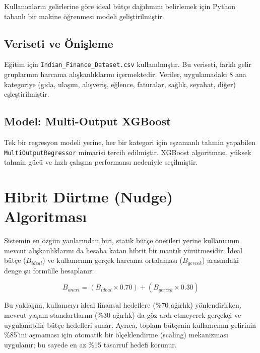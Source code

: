 Kullanıcıların gelirlerine göre ideal bütçe dağılımını belirlemek için Python tabanlı bir makine öğrenmesi modeli geliştirilmiştir.

\subsection{Veriseti ve Önişleme}
Eğitim için \texttt{Indian\_Finance\_Dataset.csv} kullanılmıştır. Bu veriseti, farklı gelir gruplarının harcama alışkanlıklarını içermektedir. Veriler, uygulamadaki 8 ana kategoriye (gıda, ulaşım, alışveriş, eğlence, faturalar, sağlık, seyahat, diğer) eşleştirilmiştir.

\subsection{Model: Multi-Output XGBoost}
Tek bir regresyon modeli yerine, her bir kategori için eşzamanlı tahmin yapabilen \texttt{MultiOutputRegressor} mimarisi tercih edilmiştir. XGBoost algoritması, yüksek tahmin gücü ve hızlı çalışma performansı nedeniyle seçilmiştir.

\section{Hibrit Dürtme (Nudge) Algoritması}

Sistemin en özgün yanlarından biri, statik bütçe önerileri yerine kullanıcının mevcut alışkanlıklarını da hesaba katan hibrit bir mantık yürütmesidir. İdeal bütçe ($B_{ideal}$) ve kullanıcının gerçek harcama ortalaması ($B_{gercek}$) arasındaki denge şu formülle hesaplanır:

\begin{equation}
\label{eq:hybrid}
   B_{oneri} = (B_{ideal} \times 0.70) + (B_{gercek} \times 0.30)
\end{equation}

Bu yaklaşım, kullanıcıyı ideal finansal hedeflere (\%70 ağırlık) yönlendirirken, mevcut yaşam standartlarını (\%30 ağırlık) da göz ardı etmeyerek gerçekçi ve uygulanabilir bütçe hedefleri sunar. Ayrıca, toplam bütçenin kullanıcının gelirinin \%85'ini aşmaması için otomatik bir ölçeklendirme (scaling) mekanizması uygulanır; bu sayede en az \%15 tasarruf hedefi korunur.
